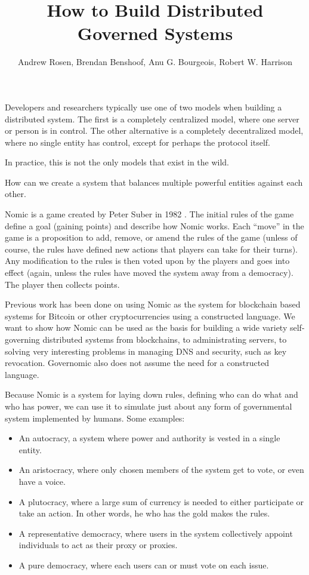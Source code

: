 \documentclass[11pt,letterpaper]{article}
\author{Andrew Rosen, Brendan Benshoof, Anu G. Bourgeois, Robert W. Harrison}
\date{}
\title{How to Build Distributed Governed Systems}
\begin{document}
	\maketitle
	
	
	Developers and researchers typically use one of two models when building a distributed system.
	The first is a completely centralized model, where one server or person is in control.
	The other alternative is a completely decentralized model, where no single entity has control, except for perhaps the protocol itself.
	
	In practice, this is not the only models that exist in the wild.  
	
	
	How can we create a system that balances multiple powerful entities against each other.
	
	
	
	Nomic is a game created by Peter Suber in 1982 \cite{nomic}.
	The initial rules of the game define a goal (gaining points) and describe how Nomic works.
	Each ``move'' in the game is a proposition to add, remove, or amend the rules of the game (unless of course, the rules have defined new actions that players can take for their turns).
	Any modification to the rules is then voted upon by the players and goes into effect (again, unless the rules have moved the system away from a democracy).
	The player then collects points.
	
	Previous work has been done on using Nomic as the system for blockchain based systems for Bitcoin or other cryptocurrencies \cite{tezos} using a constructed language.
	We want to show how Nomic can be used as the basis for building a wide variety self-governing distributed systems from blockchains, to administrating servers, to solving very interesting problems in managing DNS and security, such as key revocation.
	Governomic also does not assume the need for a constructed language.
	
	Because Nomic is a system for laying down rules, defining who can do what and who has power, we can use it to simulate just about any form of governmental system implemented by humans. 
	Some examples:
	\begin{itemize}
		\item An autocracy, a system where power and authority is vested in a single entity. 
		\item An aristocracy, where only chosen members of the system get to vote, or even have a voice.
		\item A plutocracy, where a large sum of currency is needed to either participate or take an action. In other words, he who has the gold makes the rules.
		\item A representative democracy, where users in the system collectively appoint individuals to act as their proxy or proxies.
		\item A pure democracy, where each users can or must vote on each issue.
	\end{itemize}
	
\end{document}

